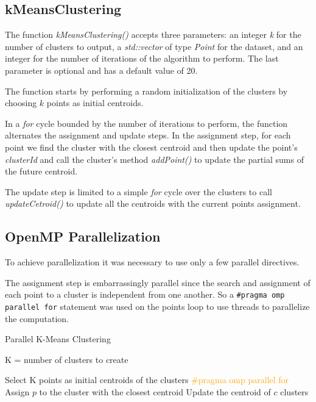 \documentclass[10pt,twocolumn,letterpaper]{article}
\begin{document}
\subsection{kMeansClustering}
The function \textit{kMeansClustering()} accepts three parameters: an integer \textit{k} for the number of clusters to output, a \textit{std::vector} of type \textit{Point} for the dataset, and an integer for the number of iterations of the algorithm to perform. The last parameter is optional and has a default value of 20.

The function starts by performing a random initialization of the clusters by choosing $k$ points as initial centroids.

In a \textit{for} cycle bounded by the number of iterations to perform, the function alternates the assignment and update steps.
In the assignment step, for each point we find the cluster with the closest centroid and then update the point's \textit{clusterId} and call the cluster's method \textit{addPoint()} to update the partial sums of the future centroid.

The update step is limited to a simple \textit{for} cycle over the clusters to call \textit{updateCetroid()} to update all the centroids with the current points assignment. 

\subsection{OpenMP Parallelization}
To achieve parallelization it was necessary to use only a few parallel directives.

The assignment step is embarrassingly parallel since the search and assignment of each point to a cluster is independent from one another.
So a \verb"#pragma omp parallel for" statement was used on the points loop to use threads to parallelize the computation.

\begin{algorithm}
	\label{alg:KMeansAlgParallel}
	\caption{Parallel K-Means Clustering}
	\begin{algorithmic}
		\Require K = number of clusters to create
		\vspace{0.5cm}
		
		\State Select K points as initial centroids of the clusters
		\State \textcolor{orange}{\#pragma omp parallel for}
		\State Assign $p$ to the cluster with the closest centroid
		\EndFor
		\State Update the centroid of $c$
		\EndFor
		\EndWhile
		\State \Return clusters
		
	\end{algorithmic}
\end{algorithm}
\end{document}
